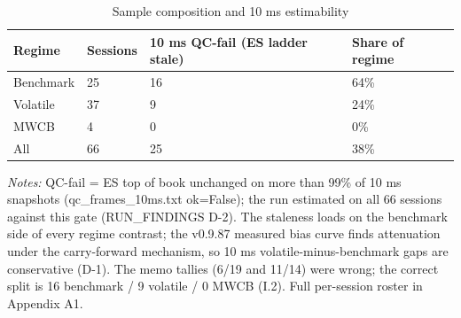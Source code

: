 \begin{table}[htbp]\centering
\caption{Sample composition and 10 ms estimability}
\label{tab:t1}
\small
\begin{tabular}{llll}
\toprule
Regime & Sessions & 10 ms QC-fail (ES ladder stale) & Share of regime \\
\midrule
Benchmark & 25 & 16 & 64\% \\
Volatile & 37 & 9 & 24\% \\
MWCB & 4 & 0 & 0\% \\
All & 66 & 25 & 38\% \\
\bottomrule
\end{tabular}
\begin{minipage}{\linewidth}\vspace{2pt}\footnotesize\emph{Notes:} QC-fail = ES top of book unchanged on more than 99\% of 10 ms snapshots (qc\_frames\_10ms.txt ok=False); the run estimated on all 66 sessions against this gate (RUN\_FINDINGS D-2). The staleness loads on the benchmark side of every regime contrast; the v0.9.87 measured bias curve finds attenuation under the carry-forward mechanism, so 10 ms volatile-minus-benchmark gaps are conservative (D-1). The memo tallies (6/19 and 11/14) were wrong; the correct split is 16 benchmark / 9 volatile / 0 MWCB (I.2). Full per-session roster in Appendix A1.\end{minipage}
\end{table}
